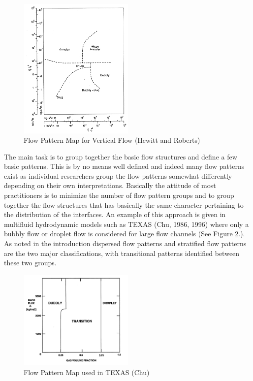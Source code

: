 \begin{figure}[h]
\includegraphics[width=0.5\textwidth]{images/hewitt_roberts_flow_map.png}
\caption{Flow Pattern Map for Vertical Flow (Hewitt and Roberts)}
\label{fig:hewitt_roberts_flow_map}
\end{figure}

The main task is to group together the basic flow structures and define a few basic patterns.
This is by no means well defined and indeed many flow patterns exist as individual researchers group the flow patterns somewhat differently depending on their own interpretations.
Basically the attitude of most practitioners is to minimize the number of flow pattern groups and to group together the flow structures that has basically the same character pertaining to the distribution of the interfaces.
An example of this approach is given in multifluid hydrodynamic models such as TEXAS (Chu, 1986, 1996) where only a bubbly flow or droplet flow is considered for large flow channels (See Figure \ref{fig:texas_flow_map}.).
As noted in the introduction dispersed flow patterns and stratified flow patterns are the two major classifications, with transitional patterns identified between these two groups.\cite{Sheikh1970}

\begin{figure}[h]
\includegraphics[width=0.5\textwidth]{images/texas_flow_map.png}
\caption{Flow Pattern Map used in TEXAS (Chu)}
\label{fig:texas_flow_map}
\end{figure}



